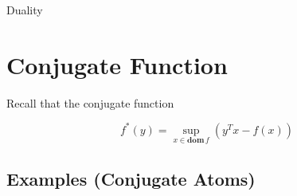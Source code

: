 \begin{chapter}{Duality}

    \section{Conjugate Function}

    Recall that the conjugate function

    \[f^*(y) = \sup_{x \in \textbf{dom} \, f} \left(y^Tx - f(x) \right)\]

    \subsection{Examples (Conjugate Atoms)}
    
    
\end{chapter}